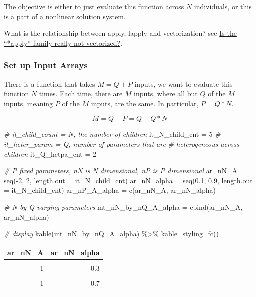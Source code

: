\documentclass[
]{book}
\newenvironment{Shaded}{\begin{snugshade}}{\end{snugshade}}
\newcommand{\AttributeTok}[1]{\textcolor[rgb]{0.77,0.63,0.00}{#1}}
\newcommand{\CommentTok}[1]{\textcolor[rgb]{0.56,0.35,0.01}{\textit{#1}}}
\newcommand{\DecValTok}[1]{\textcolor[rgb]{0.00,0.00,0.81}{#1}}
\newcommand{\FloatTok}[1]{\textcolor[rgb]{0.00,0.00,0.81}{#1}}
\newcommand{\FunctionTok}[1]{\textcolor[rgb]{0.00,0.00,0.00}{#1}}
\newcommand{\NormalTok}[1]{#1}
\newcommand{\OtherTok}[1]{\textcolor[rgb]{0.56,0.35,0.01}{#1}}
\newcommand{\SpecialCharTok}[1]{\textcolor[rgb]{0.00,0.00,0.00}{#1}}
\begin{document}
The objective is either to just evaluate this function across \(N\) individuals, or this is a part of a nonlinear solution system.

What is the relationship between apply, lapply and vectorization? see \href{https://stackoverflow.com/a/29006276/8280804}{Is the ``*apply'' family really not vectorized?}.

\hypertarget{set-up-input-arrays-2}{%
\subsubsection{Set up Input Arrays}\label{set-up-input-arrays-2}}

There is a function that takes \(M=Q+P\) inputs, we want to evaluate this function \(N\) times. Each time, there are \(M\) inputs, where all but \(Q\) of the \(M\) inputs, meaning \(P\) of the \(M\) inputs, are the same. In particular, \(P=Q*N\).

\[M = Q+P = Q + Q*N\]

\begin{Shaded}
\begin{Highlighting}[]
\CommentTok{\# it\_child\_count = N, the number of children}
\NormalTok{it\_N\_child\_cnt }\OtherTok{=} \DecValTok{5}
\CommentTok{\# it\_heter\_param = Q, number of parameters that are}
\CommentTok{\# heterogeneous across children}
\NormalTok{it\_Q\_hetpa\_cnt }\OtherTok{=} \DecValTok{2}

\CommentTok{\# P fixed parameters, nN is N dimensional, nP is P dimensional}
\NormalTok{ar\_nN\_A }\OtherTok{=} \FunctionTok{seq}\NormalTok{(}\SpecialCharTok{{-}}\DecValTok{2}\NormalTok{, }\DecValTok{2}\NormalTok{, }\AttributeTok{length.out =}\NormalTok{ it\_N\_child\_cnt)}
\NormalTok{ar\_nN\_alpha }\OtherTok{=} \FunctionTok{seq}\NormalTok{(}\FloatTok{0.1}\NormalTok{, }\FloatTok{0.9}\NormalTok{, }\AttributeTok{length.out =}\NormalTok{ it\_N\_child\_cnt)}
\NormalTok{ar\_nP\_A\_alpha }\OtherTok{=} \FunctionTok{c}\NormalTok{(ar\_nN\_A, ar\_nN\_alpha)}

\CommentTok{\# N by Q varying parameters}
\NormalTok{mt\_nN\_by\_nQ\_A\_alpha }\OtherTok{=} \FunctionTok{cbind}\NormalTok{(ar\_nN\_A, ar\_nN\_alpha)}

\CommentTok{\# display}
\FunctionTok{kable}\NormalTok{(mt\_nN\_by\_nQ\_A\_alpha) }\SpecialCharTok{\%\textgreater{}\%}
  \FunctionTok{kable\_styling\_fc}\NormalTok{()}
\end{Highlighting}
\end{Shaded}

\begin{table}[!h]
\centering
\begin{tabular}{r|r}
\hline
ar\_nN\_A & ar\_nN\_alpha\\
\hline
\cellcolor{gray!6}{-2} & \cellcolor{gray!6}{0.1}\\
\hline
-1 & 0.3\\
\hline
\cellcolor{gray!6}{0} & \cellcolor{gray!6}{0.5}\\
\hline
1 & 0.7\\
\hline
\cellcolor{gray!6}{2} & \cellcolor{gray!6}{0.9}\\
\hline
\end{tabular}
\end{table}
\end{document}
